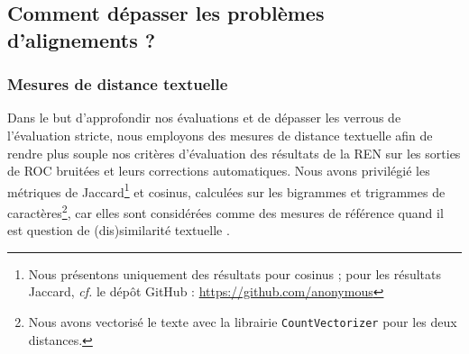 \subsection{Comment dépasser les problèmes d'alignements ? }
\label{subsec:ditances_creux_COR-OCR-IMPACT-NER}
\subsubsection{Mesures de distance textuelle}

Dans le but d'approfondir nos évaluations et de dépasser les verrous de l'évaluation stricte, nous employons des mesures de distance textuelle afin de rendre plus souple nos critères d'évaluation des résultats de la REN sur les sorties de ROC bruitées et leurs corrections automatiques. Nous avons privilégié les métriques de Jaccard\footnote{Nous présentons uniquement des résultats pour cosinus ; pour les résultats Jaccard, \textit{cf.} le dépôt GitHub : \url{https://github.com/anonymous}} et cosinus, calculées sur les bigrammes et trigrammes de caractères\footnote{Nous avons vectorisé le texte avec la librairie \texttt{CountVectorizer} pour les deux distances.}, car elles sont considérées comme des mesures de référence quand il est question de (dis)similarité textuelle \cite{buscaldi2020calcul}. 

